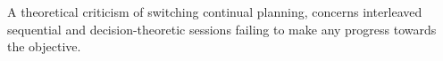 

A theoretical criticism of switching continual planning, concerns
interleaved sequential and decision-theoretic sessions failing to make
any progress towards the objective.
